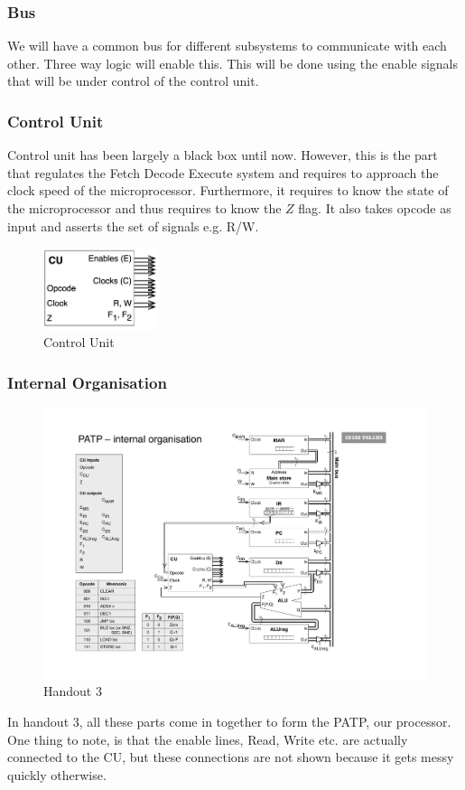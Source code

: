 \documentclass[a4paper]{article}
\theoremstyle{plain}
\theoremstyle{definition}
\theoremstyle{remark}
\begin{document}
\subsubsection{Bus}
We will have a common bus for different subsystems to communicate with each other. Three way logic will enable this. This will be done using the enable signals that will be under control of the control unit.
\subsubsection{Control Unit}
Control unit has been largely a black box until now. However, this is the part that regulates the Fetch Decode Execute system and requires to approach the clock speed of the microprocessor. Furthermore, it requires to know the state of the microprocessor and thus requires to know the $Z$ flag. It also takes opcode as input and asserts the set of signals e.g. R/W. 
\begin{figure}[H]
	\centering
	\includegraphics[width=0.3\textwidth]{figures/c.png}
	\caption{Control Unit}
	\label{fig:figures-c-png}
\end{figure}
\subsubsection{Internal Organisation}
\begin{figure}[H]
	\centering
	\includegraphics[width=1\textwidth]{PATP/3.pdf}
	\caption{Handout $3$}
	\label{fig:PATP-3-pdf}
\end{figure}
In handout $3$, all these parts come in together to form the PATP, our processor. One thing to note, is that the enable lines, Read, Write etc. are actually connected to the CU, but these connections are not shown because it gets messy quickly otherwise. 
\end{document}
